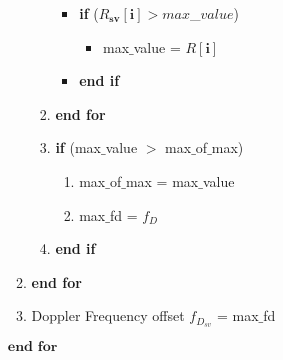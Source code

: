 \documentclass[journal,10pt,onecolumn]{article}
\begin{document}
\begin{enumerate}
\begin{enumerate}
\begin{enumerate}
          
            \begin{itemize}
                \item[] \textbf{if}  ($R{_{\textbf{sv}}}[\textbf{i}] >  max$\_$value$)
                \begin{itemize}
                    \item[] max$\_$value = $R[\textbf{i}]$
                    
                \end{itemize}
                \item[] \textbf{end if}
            \end{itemize} 
            \item[] \textbf{end for}
            \item[] \textbf{if}  (max$\_$value $>$ max$\_$of$\_$max)
            \begin{enumerate} 
                \item[]  max$\_$of$\_$max = max$\_$value
                \item[] max$\_$fd    = \textbf{$f_D$}
            \end{enumerate}
            \item[] \textbf{end if}
            
        \end{enumerate}
        \item[] \textbf{end for}
        \item[]Doppler Frequency offset $f_{D_{sv}}$ = max$\_$fd
    \end{enumerate}
    $\textbf{end for}$
\end{enumerate}    
\end{document}
